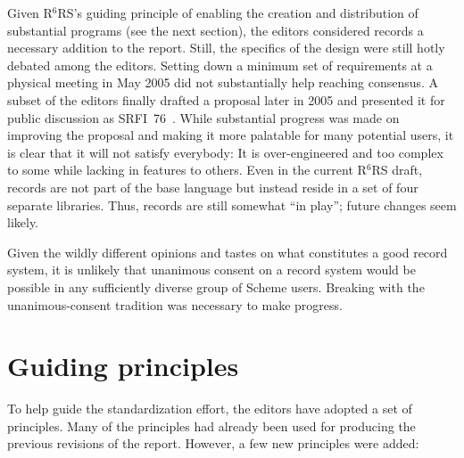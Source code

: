 \documentclass{sigplanconf}
\newcommand{\rn}[1]{R$^{#1}$RS}
\begin{document}
Given \rn{6}'s guiding principle of enabling the creation and
distribution of substantial programs (see the next section), the
editors considered records a necessary addition to the report.  Still,
the specifics of the design were still hotly debated among the
editors.  Setting down a minimum set of requirements at a physical
meeting in May 2005 did not substantially help reaching consensus.  A
subset of the editors finally drafted a proposal later in 2005 and
presented it for public discussion as SRFI~76~\cite{srfi76}.  While
substantial progress was made on improving the proposal and making it
more palatable for many potential users, it is clear that it will not
satisfy everybody: It is over-engineered and too complex to some while
lacking in features to others.  Even in the current \rn{6} draft,
records are not part of the base language but instead reside in a set
of four separate libraries.  Thus, records are still somewhat ``in
play''; future changes seem likely.

Given the wildly different opinions and tastes on what constitutes a
good record system, it is unlikely that unanimous consent on a record
system would be possible in any sufficiently diverse group of Scheme users.
Breaking with the unanimous-consent tradition was necessary to make
progress.

\section{Guiding principles}
\label{sec:principles}

To help guide the standardization effort, the editors have adopted a
set of principles.  Many of the principles had already been used for
producing the previous revisions of the report.  However, a few new
principles were added:
\end{document}
